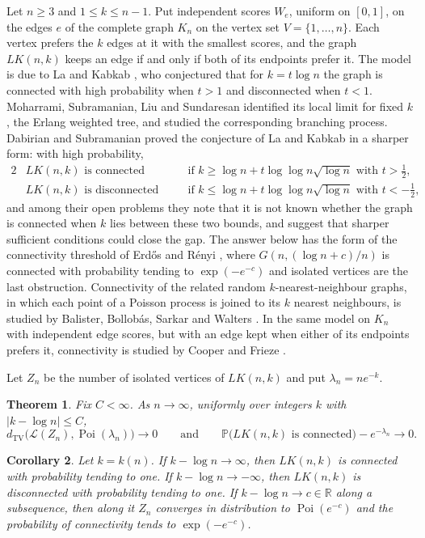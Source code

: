 \documentclass[11pt]{amsart}
\newtheorem{theorem}{Theorem}[section]
\newtheorem{corollary}[theorem]{Corollary}
\theoremstyle{remark}
\numberwithin{equation}{section}
\newcommand{\Pp}{\mathbb P}
\newcommand{\Poi}{\operatorname{Poi}}
\newcommand{\dtv}{d_{\mathrm{TV}}}
\newcommand{\1}{\mathbf 1}
\begin{document}
Let $n\ge3$ and $1\le k\le n-1$. Put independent scores $W_e$, uniform on $[0,1]$, on the edges $e$ of the complete graph $K_n$ on the vertex set $V=\{1,\dots,n\}$. Each vertex prefers the $k$ edges at it with the smallest scores, and the graph $LK(n,k)$ keeps an edge if and only if both of its endpoints prefer it. The model is due to La and Kabkab \cite{LK}, who conjectured that for $k=t\log n$ the graph is connected with high probability when $t>1$ and disconnected when $t<1$. Moharrami, Subramanian, Liu and Sundaresan \cite{EWT} identified its local limit for fixed $k$, the Erlang weighted tree, and studied the corresponding branching process. Dabirian and Subramanian \cite{DS} proved the conjecture of La and Kabkab in a sharper form: with high probability,
\begin{alignat*}{2}
&LK(n,k)\text{ is connected}&\qquad&\text{if }k\ge\log n+t\log\log n\sqrt{\log n}\text{ with }t>\tfrac12,\\
&LK(n,k)\text{ is disconnected}&&\text{if }k\le\log n+t\log\log n\sqrt{\log n}\text{ with }t<-\tfrac12,
\end{alignat*}
and among their open problems \cite[Section~1]{DS} they note that it is not known whether the graph is connected when $k$ lies between these two bounds, and suggest that sharper sufficient conditions could close the gap. The answer below has the form of the connectivity threshold of Erd\H{o}s and R\'enyi \cite{ER}, where $G(n,(\log n+c)/n)$ is connected with probability tending to $\exp(-e^{-c})$ and isolated vertices are the last obstruction. Connectivity of the related random $k$-nearest-neighbour graphs, in which each point of a Poisson process is joined to its $k$ nearest neighbours, is studied by Balister, Bollob\'as, Sarkar and Walters \cite{BBSW}. In the same model on $K_n$ with independent edge scores, but with an edge kept when either of its endpoints prefers it, connectivity is studied by Cooper and Frieze \cite{CF}.

Let $Z_n$ be the number of isolated vertices of $LK(n,k)$ and put $\lambda_n=ne^{-k}$.

\begin{theorem}\label{thm:main}
Fix $C<\infty$. As $n\to\infty$, uniformly over integers $k$ with $|k-\log n|\le C$,
\[
\dtv\bigl(\mathcal L(Z_n),\Poi(\lambda_n)\bigr)\to0
\qquad\text{and}\qquad
\Pp\bigl(LK(n,k)\text{ is connected}\bigr)-e^{-\lambda_n}\to0 .
\]
\end{theorem}

\begin{corollary}\label{cor:band}
Let $k=k(n)$. If $k-\log n\to\infty$, then $LK(n,k)$ is connected with probability tending to one. If $k-\log n\to-\infty$, then $LK(n,k)$ is disconnected with probability tending to one. If $k-\log n\to c\in\mathbb R$ along a subsequence, then along it $Z_n$ converges in distribution to $\Poi(e^{-c})$ and the probability of connectivity tends to $\exp(-e^{-c})$.
\end{corollary}
\end{document}
